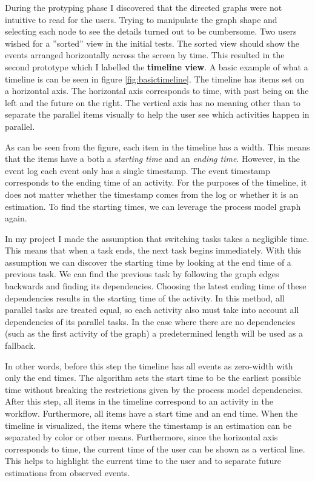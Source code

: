 During the protyping phase I discovered that the directed graphs were not intuitive to read for the users.
Trying to manipulate the graph shape and selecting each node to see the details turned out to be cumbersome.
Two users wished for a ''sorted'' view in the initial tests.
The sorted view should show the events arranged horizontally across the screen by time.
This resulted in the second prototype which I labelled the \textbf{timeline view}.
A basic example of what a timeline is can be seen in figure \ref{fig:basictimeline}.
The timeline has items set on a horizontal axis.
The horizontal axis corresponds to time, with past being on the left and the future on the right.
The vertical axis has no meaning other than to separate the parallel items visually to help the user see which activities happen in parallel.

As can be seen from the figure, each item in the timeline has a width.
This means that the items have a both a \textit{starting time} and an \textit{ending time}.
However, in the event log each event only has a single timestamp.
The event timestamp corresponds to the ending time of an activity.
For the purposes of the timeline, it does not matter whether the timestamp comes from the log or whether it is an estimation.
To find the starting times, we can leverage the process model graph again.

In my project I made the assumption that switching tasks takes a negligible time.
This means that when a task ends, the next task begins immediately.
With this assumption we can discover the starting time by looking at the end time of a previous task.
We can find the previous task by following the graph edges backwards and finding its dependencies.
Choosing the latest ending time of these dependencies results in the starting time of the activity.
In this method, all parallel tasks are treated equal, so each activity also must take into account all dependencies of its parallel tasks.
In the case where there are no dependencies (such as the first activity of the graph) a predetermined length will be used as a fallback.

In other words, before this step the timeline has all events as zero-width with only the end times. The algorithm sets the start time to be the earliest possible time without breaking the restrictions given by the process model dependencies.
After this step, all items in the timeline correspond to an activity in the workflow. Furthermore, all items have a start time and an end time.
When the timeline is visualized, the items where the timestamp is an estimation can be separated by color or other means.
Furthermore, since the horizontal axis corresponds to time, the current time of the user can be shown as a vertical line.
This helps to highlight the current time to the user and to separate future estimations from observed events.


